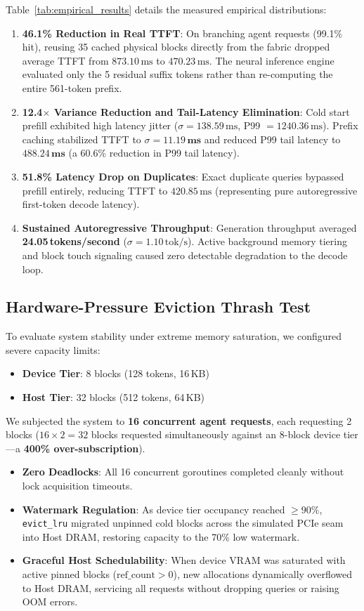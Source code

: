 \documentclass[10pt,twocolumn,letterpaper]{article}
\begin{document}
Table~\ref{tab:empirical_results} details the measured empirical distributions:
\begin{enumerate}
    \item \textbf{46.1\% Reduction in Real TTFT}: On branching agent requests (99.1\% hit), reusing 35 cached physical blocks directly from the fabric dropped average TTFT from $873.10\,\text{ms}$ to $470.23\,\text{ms}$. The neural inference engine evaluated only the 5 residual suffix tokens rather than re-computing the entire 561-token prefix.
    \item \textbf{12.4$\times$ Variance Reduction and Tail-Latency Elimination}: Cold start prefill exhibited high latency jitter ($\sigma = 138.59\,\text{ms}$, P99 $= 1240.36\,\text{ms}$). Prefix caching stabilized TTFT to $\sigma = \mathbf{11.19\,\text{ms}}$ and reduced P99 tail latency to $\mathbf{488.24\,\text{ms}}$ (a 60.6\% reduction in P99 tail latency).
    \item \textbf{51.8\% Latency Drop on Duplicates}: Exact duplicate queries bypassed prefill entirely, reducing TTFT to $420.85\,\text{ms}$ (representing pure autoregressive first-token decode latency).
    \item \textbf{Sustained Autoregressive Throughput}: Generation throughput averaged \textbf{24.05\,tokens/second} ($\sigma = 1.10\,\text{tok/s}$). Active background memory tiering and block touch signaling caused zero detectable degradation to the decode loop.
\end{enumerate}

\subsection{Hardware-Pressure Eviction Thrash Test}
To evaluate system stability under extreme memory saturation, we configured severe capacity limits:
\begin{itemize}
    \item \textbf{Device Tier}: 8 blocks (128 tokens, 16\,KB)
    \item \textbf{Host Tier}: 32 blocks (512 tokens, 64\,KB)
\end{itemize}
We subjected the system to \textbf{16 concurrent agent requests}, each requesting 2 blocks ($16 \times 2 = 32$ blocks requested simultaneously against an 8-block device tier---a \textbf{400\% over-subscription}).
\begin{itemize}
    \item \textbf{Zero Deadlocks}: All 16 concurrent goroutines completed cleanly without lock acquisition timeouts.
    \item \textbf{Watermark Regulation}: As device tier occupancy reached $\ge 90\%$, \texttt{evict\_lru} migrated unpinned cold blocks across the simulated PCIe seam into Host DRAM, restoring capacity to the 70\% low watermark.
    \item \textbf{Graceful Host Schedulability}: When device VRAM was saturated with active pinned blocks ($\text{ref\_count} > 0$), new allocations dynamically overflowed to Host DRAM, servicing all requests without dropping queries or raising OOM errors.
\end{itemize}
\end{document}
